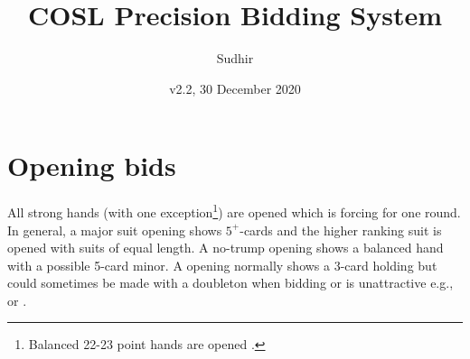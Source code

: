 \documentclass[a4paper,article,oneside]{memoir}
\newcommand{\vone}[1]{{\color{v1color}#1}}
\begin{document}
\title{COSL Precision Bidding System}
\author{Sudhir}
\date{v2.2, 30 December 2020}
\maketitle

\tableofcontents

\pagebreak

\section{Opening bids}

All strong hands (\vone{with one exception}\footnote{Balanced 22-23
  point hands are opened .}) are opened  which is forcing
for one round. In general, a major suit opening shows $5^+$-cards and
the higher ranking suit is opened with suits of equal length. A
no-trump opening shows a balanced hand with a possible 5-card minor. A
 opening normally shows a 3-card holding but could sometimes be
made with a doubleton when bidding  or  is unattractive
e.g.,  or .
\end{document}
